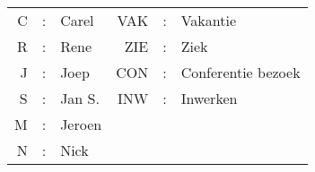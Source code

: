 {\normalsize
\begin{tabular}{rcp{6em}rcl}
C&:&Carel             &VAK&:&Vakantie             \\
R&:&Rene              &ZIE&:&Ziek                 \\
J&:&Joep              &CON&:&Conferentie bezoek   \\ 
S&:&Jan S.            &INW&:&Inwerken             \\
M&:&Jeroen            &   & &                     \\
N&:&Nick              &   & &                     \\
\end{tabular}}
